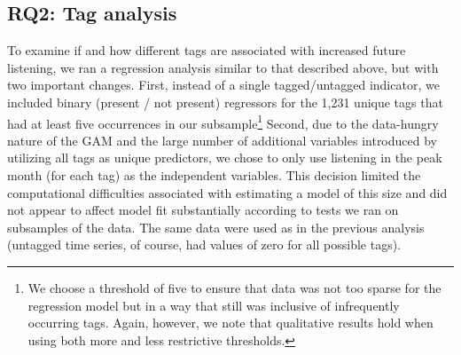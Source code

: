 \subsection{RQ2: Tag analysis}
To examine if and how different tags are associated with increased future listening, we ran a regression analysis similar to that described above, but with two important changes. First, instead of a single tagged/untagged indicator, we included binary (present / not present) regressors for the 1,231 unique tags that had at least five occurrences in our subsample\footnote{We choose a threshold of five to ensure that data was not too sparse for the regression model but in a way that still was inclusive of infrequently occurring tags.  Again, however, we note that qualitative results hold when using both more and less restrictive thresholds.} Second, due to the data-hungry nature of the GAM and the large number of additional variables introduced by utilizing all tags as unique predictors, we chose to only use listening in the peak month (for each tag) as the independent variables. This decision limited the computational difficulties associated with estimating a model of this size and did not appear to affect model fit substantially according to tests we ran on subsamples of the data. The same data were used as in the previous analysis (untagged time series, of course, had values of zero for all possible tags).

